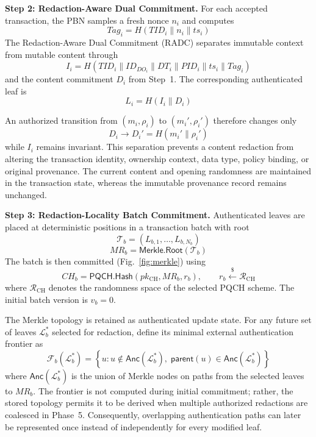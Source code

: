 \documentclass[lettersize,journal]{IEEEtran}
\begin{document}
\medskip
\noindent\textbf{Step 2: Redaction-Aware Dual Commitment.}
For each accepted transaction, the PBN samples a fresh nonce $n_i$ and
computes
\begin{equation}
Tag_i=H(TID_i\parallel n_i\parallel ts_i)
\end{equation}
The Redaction-Aware Dual Commitment (RADC) separates immutable context
from mutable content through
\begin{equation}
I_i=H(TID_i\parallel ID_{DO_i}\parallel DT_i
\parallel PID_i\parallel ts_i\parallel Tag_i)
\end{equation}
and the content commitment $D_i$ from Step~1. The corresponding
authenticated leaf is
\begin{equation}
L_i=H(I_i\parallel D_i)
\end{equation}

An authorized transition from $(m_i,\rho_i)$ to
$(m_i',\rho_i')$ therefore changes only
\begin{equation}
D_i\rightarrow D_i'=H(m_i'\parallel\rho_i')
\end{equation}
while $I_i$ remains invariant. This separation prevents a content
redaction from altering the transaction identity, ownership context,
data type, policy binding, or original provenance. The current content
and opening randomness are maintained in the transaction state, whereas
the immutable provenance record remains unchanged.

\medskip
\noindent\textbf{Step 3: Redaction-Locality Batch Commitment.}
Authenticated leaves are placed at deterministic positions in a
transaction batch with root
\begin{equation}
\mathcal{T}_b=(L_{b,1},\ldots,L_{b,N_b})
\end{equation}
\begin{equation}
MR_b=\mathsf{Merkle.Root}(\mathcal{T}_b)
\end{equation}
The batch is then committed (Fig.~\ref{fig:merkle}) using
\begin{equation}
CH_b=
\mathsf{PQCH.Hash}(pk_{\mathrm{CH}},MR_b,r_b),
\qquad
r_b\stackrel{\$}{\leftarrow}\mathcal{R}_{\mathrm{CH}}
\end{equation}
where $\mathcal{R}_{\mathrm{CH}}$ denotes the randomness space of the
selected PQCH scheme. The initial batch version is $v_b=0$.

The Merkle topology is retained as authenticated update state. For any
future set of leaves $\mathcal{L}_b^{*}$ selected for redaction, define
its minimal external authentication frontier as
\begin{equation}
\mathcal{F}_b(\mathcal{L}_b^{*})
=
\left\{
u:
u\notin\mathsf{Anc}(\mathcal{L}_b^{*}),
\;
\mathsf{parent}(u)\in
\mathsf{Anc}(\mathcal{L}_b^{*})
\right\}
\end{equation}
where $\mathsf{Anc}(\mathcal{L}_b^{*})$ is the union of Merkle nodes on
paths from the selected leaves to $MR_b$. The frontier is not computed
during initial commitment; rather, the stored topology permits it to be
derived when multiple authorized redactions are coalesced in Phase~5.
Consequently, overlapping authentication paths can later be represented
once instead of independently for every modified leaf.
\end{document}
